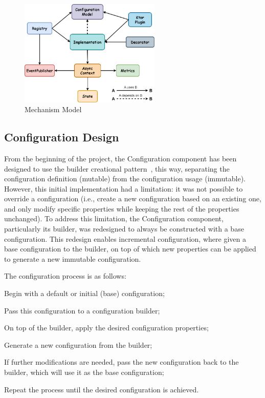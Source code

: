 \begin{figure}[!htb]
    \centering
    \includegraphics[width=0.6\textwidth]{../figures/03_mechanism-model}
    \caption{Mechanism Model}
    \label{fig:mechanism-model}
\end{figure}

\subsection{Configuration Design}\label{subsec:configuration-design}

From the beginning of the project, the Configuration component has been designed to use the builder creational pattern~\cite{effective-java, design-patterns}, this way, separating the configuration definition (mutable) from the configuration usage (immutable).
However, this initial implementation had a limitation: it was not possible to override a configuration
(i.e., create a new configuration based on an existing one,
and only modify specific properties while keeping the rest of the properties unchanged).
To address this limitation, the Configuration component, particularly its builder,
was redesigned to always be constructed with a base configuration.
This redesign enables incremental configuration,
where given a base configuration to the builder, on top of which new properties can be applied to generate a
new immutable configuration.

The configuration process is as follows:

\begin{boldenumerate}
    \item Begin with a default or initial (base) configuration;
    \item Pass this configuration to a configuration builder;
    \item On top of the builder, apply the desired configuration properties;
    \item Generate a new configuration from the builder;
    \item If further modifications are needed, pass the new configuration back to the builder, which will use it as the base configuration;
    \item Repeat the process until the desired configuration is achieved.
\end{boldenumerate}

